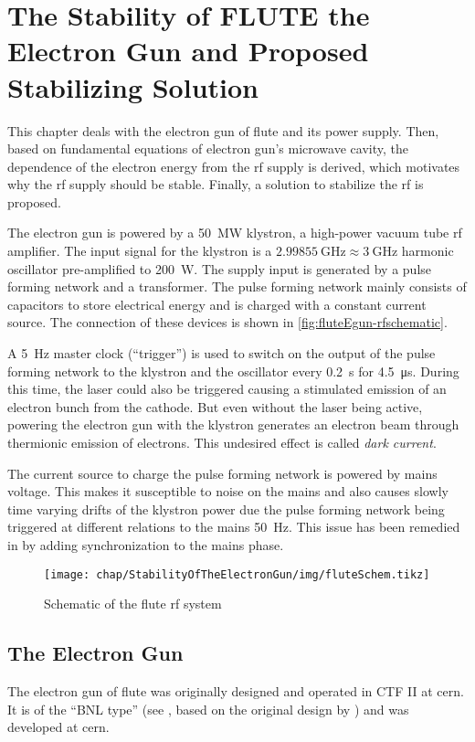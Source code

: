 \chapter{The Stability of FLUTE the Electron Gun and Proposed Stabilizing Solution}
This chapter deals with the electron gun of \gls{flute} and its power supply. Then, based on fundamental equations of electron gun's microwave cavity, the dependence of the electron energy from the \gls{rf} supply is derived, which motivates why the \gls{rf} supply should be stable. Finally, a solution to stabilize the \gls{rf} is proposed.

The electron gun is powered by a \SI{50}{\MW} klystron, a high-power vacuum tube \gls{rf} amplifier. The input signal for the klystron is a $\SI{2.99855}{\GHz}\approx\SI{3}{\GHz}$ harmonic oscillator pre-amplified to \SI{200}{\watt}. The supply input is generated by a pulse forming network and a transformer. The pulse forming network mainly consists of capacitors to store electrical energy and is charged with a constant current source. The connection of these devices is shown in \autoref{fig:fluteEgun-rfschematic}.

A \SI{5}{\hertz} master clock (``trigger'') is used to switch on the output of the pulse forming network to the klystron and the oscillator every \SI{0.2}{\second} for \SI{4.5}{\micro\second}. During this time, the laser could also be triggered causing a stimulated emission of an electron bunch from the cathode. But even without the laser being active, powering the electron gun with the klystron generates an electron beam through thermionic emission of electrons. This undesired effect is called \textit{dark current}.

The current source to charge the pulse forming network is powered by mains voltage. This makes it susceptible to noise on the mains and also causes slowly time varying drifts of the klystron power due the pulse forming network being triggered at different relations to the mains \SI{50}{\hertz}. This issue has been remedied in \cite{Nasse2019} by adding synchronization to the mains phase.

\begin{figure}[tbh]
	\centering
	\texttt{[image: chap/StabilityOfTheElectronGun/img/fluteSchem.tikz]}
	\caption[FLUTE RF schematic]{Schematic of the \gls{flute} \gls{rf} system}
	\label{fig:fluteEgun-rfschematic}
\end{figure}

\section{The Electron Gun}
The electron gun of \gls{flute} was originally designed and operated in CTF II at \gls{cern}. \cite{Schuh2014}
It is of the ``BNL type'' (see \cite{Batchelor1988}, based on the original design by \cite{fraser1987}) and was  developed at \gls{cern}. \cite{Bossart:288412}

